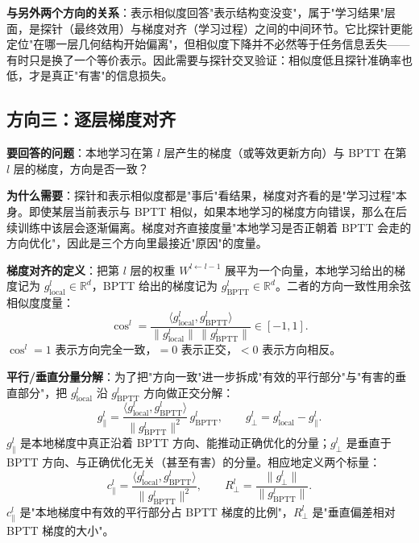 \documentclass[journal,12pt,onecolumn]{IEEEtran}
\begin{document}
\textbf{与另外两个方向的关系}：表示相似度回答"表示结构变没变"，属于"学习结果"层面，是探针（最终效用）与梯度对齐（学习过程）之间的中间环节。它比探针更能定位"在哪一层几何结构开始偏离"，但相似度下降并不必然等于任务信息丢失——有时只是换了一个等价表示。因此需要与探针交叉验证：相似度低且探针准确率也低，才是真正"有害"的信息损失。

\subsection{方向三：逐层梯度对齐}

\textbf{要回答的问题}：本地学习在第 $l$ 层产生的梯度（或等效更新方向）与 BPTT 在第 $l$ 层的梯度，方向是否一致？

\textbf{为什么需要}：探针和表示相似度都是"事后"看结果，梯度对齐看的是"学习过程"本身。即使某层当前表示与 BPTT 相似，如果本地学习的梯度方向错误，那么在后续训练中该层会逐渐偏离。梯度对齐直接度量"本地学习是否正朝着 BPTT 会走的方向优化"，因此是三个方向里最接近"原因"的度量。

\textbf{梯度对齐的定义}：把第 $l$ 层的权重 $W^{l\leftarrow l-1}$ 展平为一个向量，本地学习给出的梯度记为 $g^l_{\mathrm{local}}\in\mathbb R^d$，BPTT 给出的梯度记为 $g^l_{\mathrm{BPTT}}\in\mathbb R^d$。二者的方向一致性用余弦相似度度量：
\begin{equation}
\cos^l = \frac{\langle g^l_{\mathrm{local}}, g^l_{\mathrm{BPTT}}\rangle}{\|g^l_{\mathrm{local}}\|\,\|g^l_{\mathrm{BPTT}}\|}
\in[-1,1].
\end{equation}
$\cos^l=1$ 表示方向完全一致，$=0$ 表示正交，$<0$ 表示方向相反。

\textbf{平行/垂直分量分解}：为了把"方向一致"进一步拆成"有效的平行部分"与"有害的垂直部分"，把 $g^l_{\mathrm{local}}$ 沿 $g^l_{\mathrm{BPTT}}$ 方向做正交分解：
\begin{equation}
g^l_{\parallel} = \frac{\langle g^l_{\mathrm{local}}, g^l_{\mathrm{BPTT}}\rangle}{\|g^l_{\mathrm{BPTT}}\|^2}\,g^l_{\mathrm{BPTT}},
\qquad
g^l_{\perp} = g^l_{\mathrm{local}} - g^l_{\parallel}.
\end{equation}
$g^l_{\parallel}$ 是本地梯度中真正沿着 BPTT 方向、能推动正确优化的分量；$g^l_{\perp}$ 是垂直于 BPTT 方向、与正确优化无关（甚至有害）的分量。相应地定义两个标量：
\begin{equation}
c^l_{\parallel} = \frac{\langle g^l_{\mathrm{local}}, g^l_{\mathrm{BPTT}}\rangle}{\|g^l_{\mathrm{BPTT}}\|^2},
\qquad
R^l_{\perp} = \frac{\|g^l_{\perp}\|}{\|g^l_{\mathrm{BPTT}}\|}.
\end{equation}
$c^l_{\parallel}$ 是"本地梯度中有效的平行部分占 BPTT 梯度的比例"，$R^l_{\perp}$ 是"垂直偏差相对 BPTT 梯度的大小"。
\end{document}
